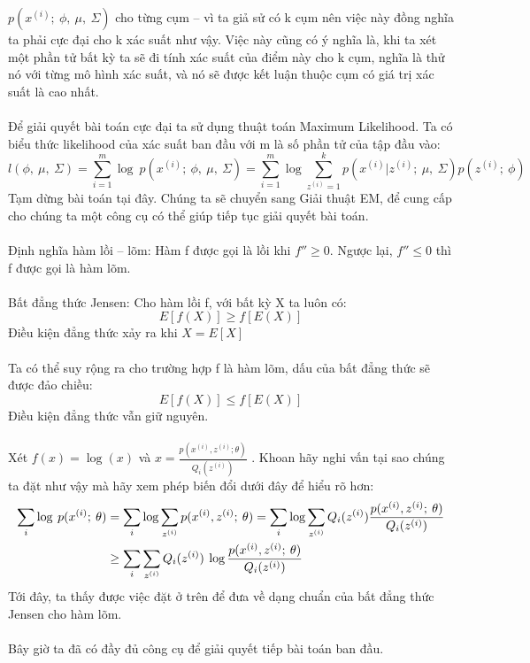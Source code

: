 $p(x^{(i)};\:\phi,\:\mu,\:\Sigma)$ cho từng cụm – vì ta giả sử có k cụm nên việc này đồng nghĩa ta phải cực đại cho k xác suất như
vậy. Việc này cũng có ý nghĩa là, khi ta xét một phần tử bất kỳ ta sẽ đi tính
xác suất của điểm này cho k cụm, nghĩa là thử nó với từng mô hình xác suất, và
nó sẽ được kết luận thuộc cụm có giá trị xác suất là cao nhất.\\\\ 
Để giải quyết bài toán cực đại ta sử dụng thuật toán Maximum Likelihood. Ta có
biểu thức likelihood của xác suất ban đầu với m là số phần tử của tập đầu vào:
\[ l(\phi,\:\mu,\:\Sigma) = \sum_{i=1}^{m} \log\:
p(x^{(i)};\:\phi,\:\mu,\:\Sigma) = \sum_{i=1}^{m} \log \sum_{z^{(i)}=1}^{k}
p(x^{(i)}|z^{(i)};\:\mu,\:\Sigma)p(z^{(i)};\:\phi) \]
Tạm dừng bài toán tại đây. Chúng ta sẽ chuyển sang Giải thuật EM, để cung cấp
cho chúng ta một công cụ có thể giúp tiếp tục giải quyết bài toán.\\\\ 
Định nghĩa hàm lồi – lõm: Hàm f được gọi là lồi khi $f'' \geq 0$. Ngược lại, 
$f'' \leq 0$ thì f được gọi là hàm lõm.\\\\ 
Bất đẳng thức Jensen: Cho hàm lồi f, với bất kỳ X ta luôn có:
\[ E[f(X)] \geq f[E(X)] \]
Điều kiện đẳng thức xảy ra khi $X=E[X]$\\\\
Ta có thể suy rộng ra cho trường hợp f là hàm lõm, dấu của bất đẳng thức sẽ được
đảo chiều:
\[ E[f(X)] \leq f[E(X)] \]
Điều kiện đẳng thức vẫn giữ nguyên.\\\\ 
Xét $f(x) = \log(x)$ và $x=\frac{p(x^{(i)},z^{(i)};\theta)}{Q_i(z^{(i)})} $ .
Khoan hãy nghi vấn tại sao chúng ta đặt như vậy mà hãy xem phép biến đổi dưới đây để hiểu rõ hơn:
\begin{align} \sum_{i} \log\: p(x^{(i)};\:\theta) & = \sum_{i} \log
\sum_{z^{(i)}} p(x^{(i)},z^{(i)};\:\theta) = \sum_{i} \log \sum_{z^{(i)}}
Q_i(z^{(i)})\frac{p(x^{(i)},z^{(i)};\:\theta)}{Q_i(z^{(i)})}  \notag \\
& \geq \sum_{i} \sum_{z^{(i)}}
Q_i(z^{(i)})\:\log \frac{p(x^{(i)},z^{(i)};\:\theta)}{Q_i(z^{(i)})} \notag
\end{align}
Tới đây, ta thấy được việc đặt ở trên để đưa về dạng chuẩn của bất đẳng thức
Jensen cho hàm lõm.\\\\ 
Bây giờ ta đã có đầy đủ công cụ để giải quyết tiếp bài toán ban đầu.\\\\ 
